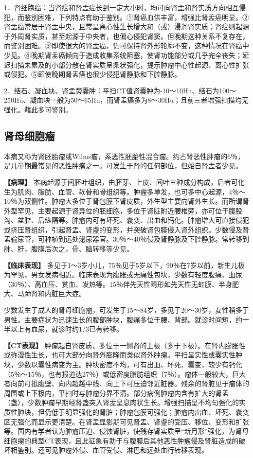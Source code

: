 1．肾细胞癌：当肾癌和肾盂癌长到一定大小时，均可向肾盂和肾实质方向相互侵犯，而鉴别困难，下列特点有助于鉴别。①肾癌血供丰富，增强比肾盂癌明显。②肾盂癌常居于肾盂中央，且常呈离心性生长增大和（或）浸润肾实质；肾癌则起源于外周肾实质，甚至起源于中央者，也偏心侵犯肾窦。但晚期这种关系不复存在，而鉴别困难。③即使很大的肾盂癌，仍可保持肾外形轮廓不变，这种情况在肾癌中少见。④晚期肾盂癌倾向于造成收集系统阻塞，使肾功能部分或几乎完全丧失；延迟扫描未累及的小部分散在肾实质呈条状强化，提示肿瘤中心性起源、离心性扩张或侵犯。⑤即使晚期肾盂癌也很少侵犯肾静脉和下腔静脉。

2．结石、凝血块、肾盂旁囊肿：平扫CT值肾囊肿为-10～10Hu、结石为100～250Hu、凝血块一般为50～65Hu，而肾盂癌多为8～30Hu；且前三者增强扫描均无强化。藉此多可鉴别。

\subsection{肾母细胞瘤}

本病又称为肾胚胎瘤或Wilms瘤，系恶性胚胎性混合瘤。约占肾恶性肿瘤的6％，是儿童期最常见的恶性肿瘤之一。可发生于肾的任何部位，但始自肾盂者少见。

\textbf{【病理】}
本病起源于间胚叶组织，由胚芽、上皮、间叶三种成分构成，后者可化生为肌肉、脂肪、血管、软骨和骨组织等。肿瘤多单发，也可多中心起源，4％～10％为双侧性。肿瘤大多位于肾包膜下肾皮质，外生型主要向肾外生长。而所谓肾外型罕见，主要起源于肾异位的胚细胞，多位于肾脏附近腰椎旁，亦可位于腹股沟、盆腔、后纵隔等。肿瘤内可有坏死、囊变、出血和钙化。肿瘤增大可直接侵犯或挤压肾组织，引起肾盂、肾盏的变形，并突破肾包膜侵入肾外组织。少数侵及肾盂输尿管，可种植到远处泌尿器官。30％～40％侵及肾静脉及下腔静脉。常转移到肺、肝，腹膜后次之，骨、脑转移等少见。

\textbf{【临床表现】}
多见于1～3岁小儿，75％见于5岁以下，90％在7岁以前，新生儿极为罕见，男女发病相近。临床表现为腹胀或无痛性包块，少数有轻度腹痛、血尿（30％）、高血压、贫血、发热等。15％伴先天性畸形如先天性无虹膜、半身肥大、马蹄肾和内脏巨大症。

少数发生于成人的肾母细胞瘤，可发生于15～84岁，多见于20～30岁，女性稍多于男性。主要症状为迅速生长的腹部肿块，腹痛多位于腰、背部。就诊时间短，约一半以上有血尿，就诊时约1/3已有转移。

\textbf{【CT表现】}
肿瘤起自肾皮质，多位于一侧肾的上极（多于下极）。在肾内膨胀性或弥漫性生长，也可大部分向肾外膨隆而类似肾外肿瘤。平扫呈实性或囊实性肿块，少数以囊性病变为主。肿块密度不均，可有出血、坏死、囊变，较少有钙化（5％～15％，也有报道达27％）或低密度脂肪组织（7％）。瘤体一般较大，巨大者向前可抵腹壁、向内超越中线、向上下可压迫邻近脏器。残余的肾脏见于瘤体的周围或上下极内，平扫时与肿瘤分界不清。部分病例肿瘤内含有扩大的肾盂（盏），少数肿瘤早期经肾盏突入肾盂呈息肉状生长。增强扫描呈不均匀强化的实质性肿块，但仍低于明显强化的肾脏；肿瘤包膜可强化；肿瘤内出血、坏死、囊变区无强化而显示更清楚。在肾盂显影期可见肾盂、肾盏的受压、移位、变形和扩张等。国内有学者认为肿瘤压迫、侵蚀肾脏，使残存肾实质呈“新月形”强化，为肾母细胞瘤的典型CT表现，且此征象有助于与腹膜后其他恶性肿瘤侵及肾脏造成的破坏相鉴别。还可见肿瘤外侵、血管受侵、淋巴和远处血行转移表现。

